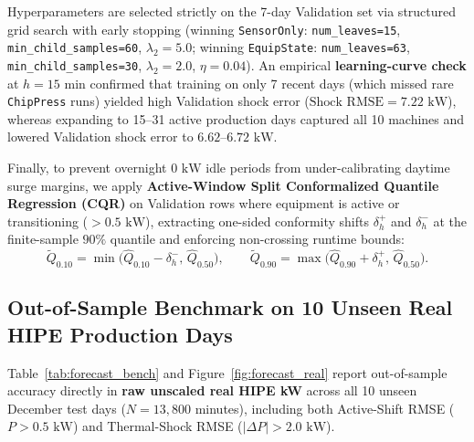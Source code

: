Hyperparameters are selected strictly on the 7-day Validation set via structured grid search with early stopping (winning \texttt{SensorOnly}: \texttt{num\_leaves=15}, \texttt{min\_child\_samples=60}, $\lambda_2=5.0$; winning \texttt{EquipState}: \texttt{num\_leaves=63}, \texttt{min\_child\_samples=30}, $\lambda_2=2.0$, $\eta=0.04$). An empirical \textbf{learning-curve check} at $h=15\text{ min}$ confirmed that training on only 7 recent days (which missed rare \texttt{ChipPress} runs) yielded high Validation shock error ($\text{Shock RMSE} = 7.22\text{ kW}$), whereas expanding to 15--31 active production days captured all 10 machines and lowered Validation shock error to $6.62\text{--}6.72\text{ kW}$.

Finally, to prevent overnight $0\text{ kW}$ idle periods from under-calibrating daytime surge margins, we apply \textbf{Active-Window Split Conformalized Quantile Regression (CQR)} on Validation rows where equipment is active or transitioning ($>0.5\text{ kW}$), extracting one-sided conformity shifts $\delta^{+}_{h}$ and $\delta^{-}_{h}$ at the finite-sample $90\%$ quantile and enforcing non-crossing runtime bounds:
\begin{equation}
\tilde{Q}_{0.10} = \min\!\big(\hat{Q}_{0.10} - \delta^{-}_{h},\, \hat{Q}_{0.50}\big), \qquad
\tilde{Q}_{0.90} = \max\!\big(\hat{Q}_{0.90} + \delta^{+}_{h},\, \hat{Q}_{0.50}\big).
\label{eq:cqr}
\end{equation}

\subsection{Out-of-Sample Benchmark on 10 Unseen Real HIPE Production Days}

Table~\ref{tab:forecast_bench} and Figure~\ref{fig:forecast_real} report out-of-sample accuracy directly in \textbf{raw unscaled real HIPE kW} across all 10 unseen December test days ($N = 13{,}800$ minutes), including both Active-Shift RMSE ($P > 0.5\text{ kW}$) and Thermal-Shock RMSE ($|\Delta P| > 2.0\text{ kW}$).

